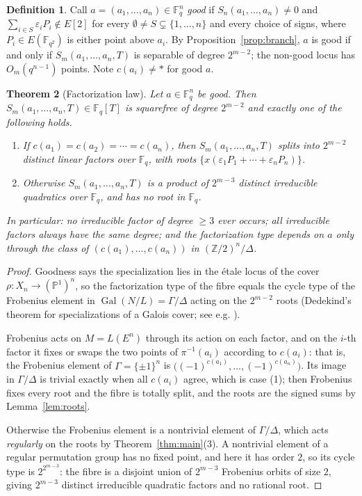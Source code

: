 \documentclass[11pt,a4paper]{article}
\theoremstyle{plain}
\newtheorem{theorem}{Theorem}[section]
\theoremstyle{definition}
\newtheorem{definition}[theorem]{Definition}
\DeclareMathOperator{\Gal}{Gal}
\newcommand{\PP}{\mathbb{P}}
\newcommand{\FF}{\mathbb{F}}
\newcommand{\ZZ}{\mathbb{Z}}
\newcommand{\Fq}{\FF_q}
\newcommand{\eps}{\varepsilon}
\begin{document}
\begin{definition}\label{def:good}
Call $a = (a_1,\dots,a_n) \in \Fq^n$ \emph{good} if $S_n(a_1,\dots,a_n) \neq 0$
and $\sum_{i \in S} \eps_i P_i \notin E[2]$ for every
$\emptyset \neq S \subsetneq \{1,\dots,n\}$ and every choice of signs, where
$P_i \in E(\FF_{q^2})$ is either point above $a_i$. By
Proposition~\ref{prop:branch}, $a$ is good if and only if
$S_m(a_1,\dots,a_n,T)$ is separable of degree $2^{m-2}$; the non-good locus has
$O_m(q^{n-1})$ points. Note $c(a_i) \neq \ast$ for good $a$.
\end{definition}

\begin{theorem}[Factorization law]\label{thm:frob}
Let $a \in \Fq^n$ be good. Then $S_m(a_1,\dots,a_n,T) \in \Fq[T]$ is squarefree
of degree $2^{m-2}$ and exactly one of the following holds.
\begin{enumerate}
\item If $c(a_1) = c(a_2) = \cdots = c(a_n)$, then $S_m(a_1,\dots,a_n,T)$ splits
  into $2^{m-2}$ distinct linear factors over $\Fq$, with roots
  $\{ x(\eps_1 P_1 + \cdots + \eps_n P_n) \}$.
\item Otherwise $S_m(a_1,\dots,a_n,T)$ is a product of $2^{m-3}$ distinct
  irreducible quadratics over $\Fq$, and has \emph{no} root in $\Fq$.
\end{enumerate}
In particular: no irreducible factor of degree $\ge 3$ ever occurs; all
irreducible factors always have the same degree; and the factorization type
depends on $a$ only through the class of $(c(a_1),\dots,c(a_n))$ in
$(\ZZ/2)^n / \Delta$.
\end{theorem}

\begin{proof}
Goodness says the specialization lies in the étale locus of the cover
$\rho \colon X_n \to (\PP^1)^n$, so the factorization type of the fibre equals the
cycle type of the Frobenius element in $\Gal(N/L) = \Gamma/\Delta$ acting on the
$2^{m-2}$ roots (Dedekind's theorem for specializations of a Galois cover; see
e.g. \cite[Ch.~6]{fj2008}).

Frobenius acts on $M = L(E^n)$ through its action on each factor, and on the
$i$-th factor it fixes or swaps the two points of $\pi^{-1}(a_i)$ according to
$c(a_i)$: that is, the Frobenius element of $\Gamma = \{\pm1\}^n$ is
$\bigl( (-1)^{c(a_1)},\dots,(-1)^{c(a_n)} \bigr)$. Its image in $\Gamma/\Delta$ is
trivial exactly when all $c(a_i)$ agree, which is case (1); then Frobenius fixes
every root and the fibre is totally split, and the roots are the signed sums by
Lemma~\ref{lem:roots}.

Otherwise the Frobenius element is a nontrivial element of $\Gamma/\Delta$, which
acts \emph{regularly} on the roots by Theorem~\ref{thm:main}(3). A nontrivial
element of a regular permutation group has no fixed point, and here it has order
$2$, so its cycle type is $2^{2^{m-3}}$: the fibre is a disjoint union of
$2^{m-3}$ Frobenius orbits of size $2$, giving $2^{m-3}$ distinct irreducible
quadratic factors and no rational root.
\end{proof}
\end{document}
